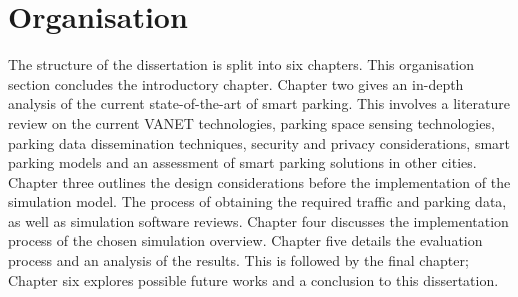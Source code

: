 \section{Organisation}
The structure of the dissertation is split into six chapters. This organisation section concludes the introductory chapter. Chapter two gives an in-depth analysis of the current state-of-the-art of smart parking. This involves a literature review on the current \ac{VANET} technologies, parking space sensing technologies, parking data dissemination techniques, security and privacy considerations, smart parking models and an assessment of smart parking solutions in other cities. Chapter three outlines the design considerations before the implementation of the simulation model. The process of obtaining the required traffic and parking data, as well as simulation software reviews. Chapter four discusses the implementation process of the chosen simulation overview. Chapter five details the evaluation process and an analysis of the results. This is followed by the final chapter; Chapter six explores possible future works and a conclusion to this dissertation.